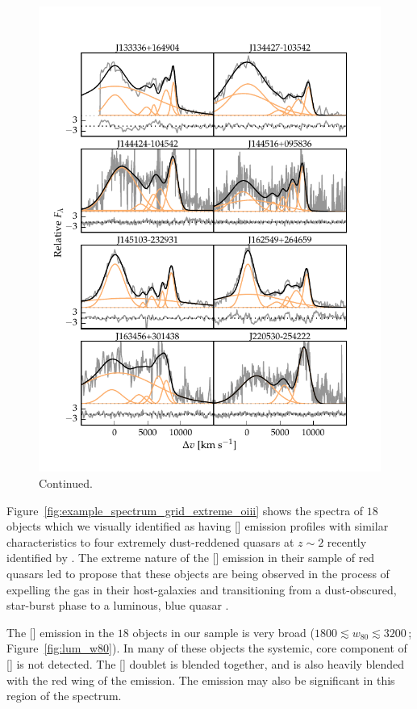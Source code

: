\begin{figure}[t!]
\ContinuedFloat
    \centering
    \includegraphics[width=\columnwidth]{figures/chapter04/example_spectrum_grid_extreme_oiii_2.pdf}
    \caption[]{Continued.}
\end{figure}

Figure~\ref{fig:example_spectrum_grid_extreme_oiii} shows the spectra of $18$ objects which we visually identified as having [] emission profiles with similar characteristics to four extremely dust-reddened quasars at $z\sim2$ recently identified by \citet{zakamska16}.
The extreme nature of the [] emission in their sample of red quasars led \citet{zakamska16} to propose that these objects are being observed in the process of expelling the gas in their host-galaxies and transitioning from a dust-obscured, star-burst phase to a luminous, blue quasar \citep[e.g.][]{sanders88}.

The [] emission in the $18$ objects in our sample is very broad ($1800 \lesssim w_{80} \lesssim 3200$\,\kms; Figure~\ref{fig:lum_w80}).
In many of these objects the systemic, core component of [] is not detected.
The [] doublet is blended together, and is also heavily blended with the red wing of the \hb emission.
The  emission may also be significant in this region of the spectrum.

